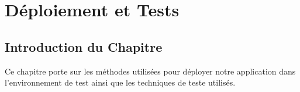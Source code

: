 
\chapter{Déploiement et Tests}

\section{Introduction du Chapitre}

Ce chapitre porte sur les méthodes utilisées pour déployer notre application dans l'environnement de test ainsi que les techniques de teste utilisés.

